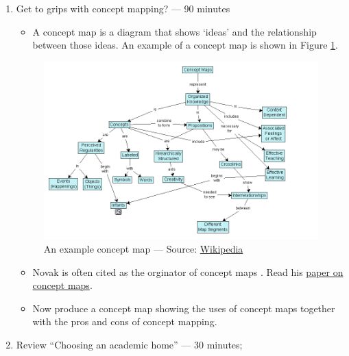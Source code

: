\documentclass[]{book}
\providecommand{\tightlist}{%
  \setlength{\itemsep}{0pt}\setlength{\parskip}{0pt}}
\theoremstyle{definition}
\theoremstyle{definition}
\theoremstyle{definition}
\theoremstyle{remark}
\begin{document}
\begin{enumerate}
\def\labelenumi{\arabic{enumi}.}
\item
  Get to grips with concept mapping? --- 90 minutes

  \begin{itemize}
  \tightlist
  \item
    A concept map is a diagram that shows `ideas' and the relationship
    between those ideas. An example of a concept map is shown in Figure
    \ref{fig:exampleCM}.
  \end{itemize}

  \begin{figure}
   \includegraphics[width=12.33in]{images/ConceptMap} \caption{An example concept map --- Source:
\href{https://upload.wikimedia.org/wikipedia/commons/d/df/Conceptmap.png}{Wikipedia}}\label{fig:exampleCM}
   \end{figure}

  \begin{itemize}
  \item
    Novak is often cited as the orginator of concept maps \autocite[for
    example,][]{novak_2006_originsconceptmapping}. Read his
    \href{https://msu.edu/~luckie/ctools/}{paper on concept maps}.
  \item
    Now produce a concept map showing the uses of concept maps together
    with the pros and cons of concept mapping.
  \end{itemize}
\item
  Review ``Choosing an academic home''
  \autocite{huff_2009_designingresearchpublication} --- 30 minutes;
\end{enumerate}
\end{document}
